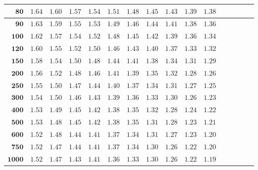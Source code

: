 \begin{customTableWrapper}{1.4}
\begin{longtable}{|r|r|r|r|r|r|r|r|r|r|r|r|r|r|r|r|}
    ${\mathbf{80}}$ & ${1.64}$   & ${1.60}$   & ${1.57}$   & ${1.54}$   & ${1.51}$   & ${1.48}$   & ${1.45}$   & ${1.43}$   & ${1.39}$   & ${1.38}$   \\ \hline 
    ${\mathbf{90}}$ & ${1.63}$   & ${1.59}$   & ${1.55}$   & ${1.53}$   & ${1.49}$   & ${1.46}$   & ${1.44}$   & ${1.41}$   & ${1.38}$   & ${1.36}$   \\ \hline 
    ${\mathbf{100}}$ & ${1.62}$   & ${1.57}$   & ${1.54}$   & ${1.52}$   & ${1.48}$   & ${1.45}$   & ${1.42}$   & ${1.39}$   & ${1.36}$   & ${1.34}$   \\ \hline 
    ${\mathbf{120}}$ & ${1.60}$   & ${1.55}$   & ${1.52}$   & ${1.50}$   & ${1.46}$   & ${1.43}$   & ${1.40}$   & ${1.37}$   & ${1.33}$   & ${1.32}$   \\ \hline 
    ${\mathbf{150}}$ & ${1.58}$   & ${1.54}$   & ${1.50}$   & ${1.48}$   & ${1.44}$   & ${1.41}$   & ${1.38}$   & ${1.34}$   & ${1.31}$   & ${1.29}$   \\ \hline 
    ${\mathbf{200}}$ & ${1.56}$   & ${1.52}$   & ${1.48}$   & ${1.46}$   & ${1.41}$   & ${1.39}$   & ${1.35}$   & ${1.32}$   & ${1.28}$   & ${1.26}$   \\ \hline 
    ${\mathbf{250}}$ & ${1.55}$   & ${1.50}$   & ${1.47}$   & ${1.44}$   & ${1.40}$   & ${1.37}$   & ${1.34}$   & ${1.31}$   & ${1.27}$   & ${1.25}$   \\ \hline 
    ${\mathbf{300}}$ & ${1.54}$   & ${1.50}$   & ${1.46}$   & ${1.43}$   & ${1.39}$   & ${1.36}$   & ${1.33}$   & ${1.30}$   & ${1.26}$   & ${1.23}$   \\ \hline 
    ${\mathbf{400}}$ & ${1.53}$   & ${1.49}$   & ${1.45}$   & ${1.42}$   & ${1.38}$   & ${1.35}$   & ${1.32}$   & ${1.28}$   & ${1.24}$   & ${1.22}$   \\ \hline 
    ${\mathbf{500}}$ & ${1.53}$   & ${1.48}$   & ${1.45}$   & ${1.42}$   & ${1.38}$   & ${1.35}$   & ${1.31}$   & ${1.28}$   & ${1.23}$   & ${1.21}$   \\ \hline 
    ${\mathbf{600}}$ & ${1.52}$   & ${1.48}$   & ${1.44}$   & ${1.41}$   & ${1.37}$   & ${1.34}$   & ${1.31}$   & ${1.27}$   & ${1.23}$   & ${1.20}$   \\ \hline 
    ${\mathbf{750}}$ & ${1.52}$   & ${1.47}$   & ${1.44}$   & ${1.41}$   & ${1.37}$   & ${1.34}$   & ${1.30}$   & ${1.26}$   & ${1.22}$   & ${1.20}$   \\ \hline 
    ${\mathbf{1000}}$ & ${1.52}$   & ${1.47}$   & ${1.43}$   & ${1.41}$   & ${1.36}$   & ${1.33}$   & ${1.30}$   & ${1.26}$   & ${1.22}$   & ${1.19}$   \\ \hline 


\end{longtable}
\end{customTableWrapper}
\changefontsizes{10pt}


